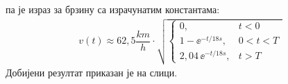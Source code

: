     па је израз за брзину са израчунатим константама: 
    \begin{eqnarray}
        v(t) \approx 62,5 \unit{\dfrac{km}{h}} \cdot 
        \sqrt{
        \begin{cases}
            0 , & t < 0 \\
            1 - \ee^{-t/18\unit{s}} , & 0 < t < T \\
            2,04\, \ee^{-t/18\unit{s}} , & t > T 
        \end{cases}
        }
    \end{eqnarray} 
    Добијени резултат приказан је на слици.




    
